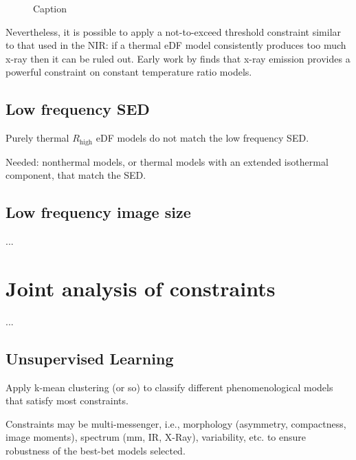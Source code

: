 \documentclass[twocolumn,tighten,dvipsnames]{aastex63}
\newcommand\Rh{R_\mathrm{high}}
\newcommand\<{{\langle}}
\renewcommand\>{{\rangle}} %
\begin{document}
\begin{figure}
    \centering
    \caption{Caption}
    \label{fig:SEDexamp}
\end{figure}

Nevertheless, it is possible to apply a not-to-exceed threshold constraint similar to that used in the NIR: if a thermal eDF model consistently produces too much x-ray then it can be ruled out.  Early work by \citet{2009ApJ...706..497M} finds that x-ray emission provides a powerful constraint on constant temperature ratio models.

\subsection{Low frequency SED}
\label{sec:lfconst}

Purely thermal $\Rh$ eDF models do not match the low frequency SED.

Needed: nonthermal models, or thermal models with an extended isothermal component, that match the SED.

\subsection{Low frequency image size}
\label{sec:lfsizeconst}

...

\section{Joint analysis of constraints}
\label{sec:allconst}

...

\subsection{Unsupervised Learning}
\label{sec:ml}

Apply k-mean clustering (or so) to classify different phenomenological models that satisfy most constraints.

Constraints may be multi-messenger, i.e., morphology (asymmetry, compactness, image moments), spectrum (mm, IR, X-Ray), variability, etc. to ensure robustness of the best-bet models selected.
\end{document}
